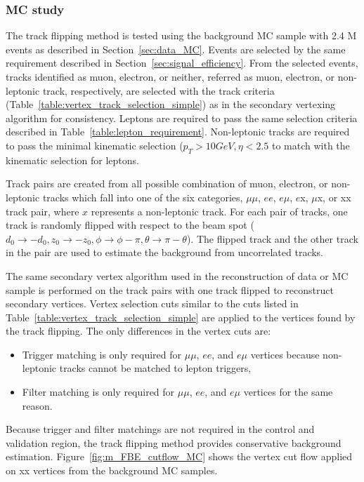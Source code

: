 \subsubsection{MC study}
\label{sec:random_crossing_MC}
The track flipping method is tested using the background MC sample with 2.4 M events as described in Section~\ref{sec:data_MC}. Events are selected by the same requirement described in Section~\ref{sec:signal_efficiency}. From the selected events, tracks identified as muon, electron, or neither, referred as muon, electron, or non-leptonic track, respectively, are selected with the track criteria (Table~\ref{table:vertex_track_selection_simple}) as in the secondary vertexing algorithm for consistency. Leptons are required to pass the same selection criteria described in Table~\ref{table:lepton_requirement}. Non-leptonic tracks are required to pass the minimal kinematic selection ($p_{T} > 10 GeV, \eta < 2.5$ to match with the kinematic selection for leptons.

Track pairs are created from all possible combination of muon, electron, or non-leptonic tracks which fall into one of the six categories, $\mu\mu$, $ee$, $e\mu$, $e$x, $\mu$x, or xx track pair, where $x$ represents a non-leptonic track. For each pair of tracks, one track is randomly flipped with respect to the beam spot ($d_{0}\rightarrow -d_{0}, z_{0}\rightarrow -z_{0}, \phi\rightarrow\phi-\pi, \theta\rightarrow\pi-\theta$). The flipped track and the other track in the pair are used to estimate the background from uncorrelated tracks.


The same secondary vertex algorithm used in the reconstruction of data or MC sample is performed on the track pairs with one track flipped to reconstruct secondary vertices. Vertex selection cuts similar to the cuts listed in Table~\ref{table:vertex_track_selection_simple} are applied to the vertices found by the track flipping. The only differences in the vertex cuts are:
\begin{itemize}
\item Trigger matching is only required for $\mu\mu$, $ee$, and $e\mu$ vertices because non-leptonic tracks cannot be matched to lepton triggers, 
\item Filter matching is only required for $\mu\mu$, $ee$, and $e\mu$ vertices for the same reason.
\end{itemize}

Because trigger and filter matchings are not required in the control and validation region, the track flipping method provides conservative background estimation. Figure~\ref{fig:m_FBE_cutflow_MC} shows the vertex cut flow applied on xx vertices from the background MC samples.

